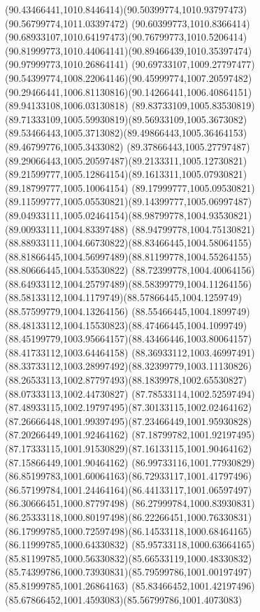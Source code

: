 {{	\curveto(90.43466441,1010.8446414)(90.50399774,1010.93797473)(90.56799774,1011.03397472)
	\curveto(90.60399773,1010.8366414)(90.68933107,1010.64197473)(90.76799773,1010.5206414)
	\curveto(90.81999773,1010.44064141)(90.89466439,1010.35397474)(90.97999773,1010.26864141)
	\curveto(90.69733107,1009.27797477)(90.54399774,1008.22064146)(90.45999774,1007.20597482)
	\curveto(90.29466441,1006.81130816)(90.14266441,1006.40864151)(89.94133108,1006.03130818)
	\curveto(89.83733109,1005.83530819)(89.71333109,1005.59930819)(89.56933109,1005.3673082)
	\curveto(89.53466443,1005.3713082)(89.49866443,1005.36464153)(89.46799776,1005.3433082)
	\curveto(89.37866443,1005.27797487)(89.29066443,1005.20597487)(89.2133311,1005.12730821)
	\curveto(89.21599777,1005.12864154)(89.1613311,1005.07930821)(89.18799777,1005.10064154)
	\curveto(89.17999777,1005.09530821)(89.11599777,1005.05530821)(89.14399777,1005.06997487)
	\curveto(89.04933111,1005.02464154)(88.98799778,1004.93530821)(89.00933111,1004.83397488)
	\curveto(88.94799778,1004.75130821)(88.88933111,1004.66730822)(88.83466445,1004.58064155)
	\curveto(88.81866445,1004.56997489)(88.81199778,1004.55264155)(88.80666445,1004.53530822)
	\curveto(88.72399778,1004.40064156)(88.64933112,1004.25797489)(88.58399779,1004.11264156)
	\curveto(88.58133112,1004.1179749)(88.57866445,1004.1259749)(88.57599779,1004.13264156)
	\curveto(88.55466445,1004.1899749)(88.48133112,1004.15530823)(88.47466445,1004.1099749)
	\curveto(88.45199779,1003.95664157)(88.43466446,1003.80064157)(88.41733112,1003.64464158)
	\curveto(88.36933112,1003.46997491)(88.33733112,1003.28997492)(88.32399779,1003.11130826)
	\curveto(88.26533113,1002.87797493)(88.1839978,1002.65530827)(88.07333113,1002.44730827)
	\curveto(87.78533114,1002.52597494)(87.48933115,1002.19797495)(87.30133115,1002.02464162)
	\curveto(87.26666448,1001.99397495)(87.23466449,1001.95930828)(87.20266449,1001.92464162)
	\curveto(87.18799782,1001.92197495)(87.17333115,1001.91530829)(87.16133115,1001.90464162)
	\lineto(87.15866449,1001.90464162)
	\curveto(86.99733116,1001.77930829)(86.85199783,1001.60064163)(86.72933117,1001.41797496)
	\curveto(86.57199784,1001.24464164)(86.44133117,1001.06597497)(86.30666451,1000.87797498)
	\curveto(86.27999784,1000.83930831)(86.25333118,1000.80197498)(86.22266451,1000.76330831)
	\curveto(86.17999785,1000.72597498)(86.14533118,1000.68464165)(86.11999785,1000.64330832)
	\curveto(85.95733118,1000.63664165)(85.81199785,1000.56330832)(85.66533119,1000.48330832)
	\curveto(85.74399786,1000.73930831)(85.79599786,1001.00197497)(85.81999785,1001.26864163)
	\curveto(85.83466452,1001.42197496)(85.67866452,1001.4593083)(85.56799786,1001.4073083)
}}
